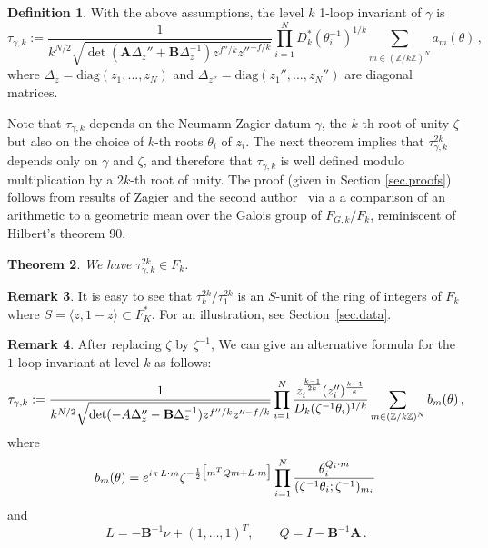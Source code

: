 \documentclass[12pt]{amsart}
\newtheorem{theorem}{Theorem}[section]
\theoremstyle{definition}
\newtheorem{definition}[theorem]{Definition}
\newtheorem{remark}[theorem]{Remark}
\def\ga{\gamma}
\def\la{\langle}
\def\ra{\rangle}
\def\th{\theta}
\def\be{  \begin{equation} }
\def\ee{  \end{equation} }
\def\diag{\text{diag}}
\newcommand{\Z}{\mathbb{Z}}
\newcommand{\mb}{\mathbf}
\begin{document}
\begin{definition}
\label{def.1loop}
With the above assumptions, the level $k$ 1-loop invariant of $\ga$ is
\be
\label{eq.tau}
\tau_{\gamma,k} :=  \frac{1}{k^{N/2}\sqrt{\det(\mb A\Delta_z''
+\mb B\Delta_z^{-1}) z^{f''/k}z''^{-f/k}}} 
\prod_{i=1}^N D_k^*(\th_i^{-1})^{1/k} \sum_{m\in (\Z/k\Z)^N} a_m(\th)\,,
\ee
where $\Delta_z = \diag(z_1,...,z_N)$ and $\Delta_{z''}=\diag(z_1'',...,z_N'')$ 
are diagonal matrices.
\end{definition}
Note that $\tau_{\gamma,k}$ depends on the Neumann-Zagier datum $\ga$,
the $k$-th root of unity $\zeta$ but also on the choice of $k$-th roots 
$\theta_i$ of $z_i$. The next theorem implies that 
$\tau_{\gamma,k}^{2k}$ depends only on $\ga$ and $\zeta$,
and therefore that $\tau_{\gamma,k}$ is well defined modulo multiplication 
by a $2k$-th root of unity.
The proof (given in Section \ref{sec.proofs}) follows from results of 
Zagier and the second author~\cite{GZ1} via a 
a comparison of an arithmetic to a geometric mean over the 
Galois group of $F_{G,k}/F_k$, reminiscent of Hilbert's theorem 90. 
%
\begin{theorem}
\label{thm.1loop}
We have $\tau_{\gamma,k}^{2k} \in F_k$.
\end{theorem}

\begin{remark}
\label{rem.Sunit}
It is easy to see that $\tau_k^{2k}/\tau_1^{2k}$ is an $S$-unit of the ring
of integers of $F_k$ where $S=\la z,1-z\ra \subset F_K^*$. For an
illustration, see Section~\ref{sec.data}.
\end{remark}

\begin{remark}
\label{rem.tau.alternative}
After replacing $\zeta$ by $\zeta^{-1}$,
We can give an alternative formula
for the $1$-loop invariant at level $k$ as follows:
\be
\label{eq.tau.alternative}
\tau_{\gamma,k} :=  \frac{1}{k^{N/2}\sqrt{\det(\mb - A\Delta_z''
-\mb B\Delta_z^{-1}) z^{f''/k}z''^{-f/k}}}
\prod_{i=1}^N \frac{z_i^{\frac{k-1}{2k}} (z_i'')^{\frac{k-1}{k}}}{
D_k(\zeta^{-1}\th_i)^{1/k}} 
\sum_{m\in (\Z/k\Z)^N} b_m(\th)\,,
\ee
where 
\be
\label{eq.alt.amth}
b_m(\theta) = e^{i\pi\, L \cdot m} 
\zeta^{-\frac12 \big[m^T Q m+ L \cdot m\big]}
\prod_{i=1}^N
\frac{\th_i^{ Q_i \cdot m}}{
(\zeta^{-1} \th_i;\zeta^{-1} )_{m_i}}\,
\ee
and
\be
\label{eq.QL}
L= -\mb B^{-1} \nu + (1,\dots,1)^T, \qquad Q=I-\mb B^{-1}\mb A \,.
\ee
\end{remark}
\end{document}

